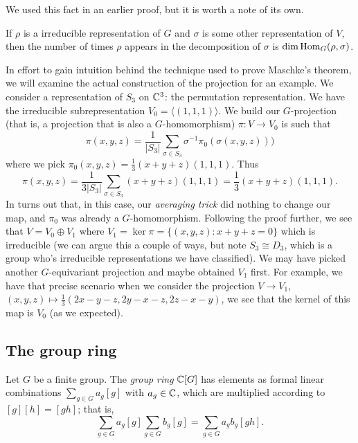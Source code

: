 We used this fact in an earlier proof, but it is worth a note of its own.

\begin{lemma}
  If $\rho$ is a irreducible representation of $G$ and $\sigma$ is some other representation of $V$, then the number of times $\rho$ appears in the decomposition of $\sigma$ is $\dim\operatorname{Hom}_G(\rho, \sigma)$.
\end{lemma}

\begin{example}
  In effort to gain intuition behind the technique used to prove Maschke's theorem, we will examine the actual construction of the projection for an example. We consider a representation of $S_3$ on $\mathbb{C}^3$: the permutation representation. We have the irreducible subrepresentation $V_0 = \langle (1,1,1) \rangle$. We build our $G$-projection (that is, a projection that is also a $G$-homomorphism) $\pi: V \to V_0$ is such that
  \[
    \pi(x,y,z) = \frac1{\lvert S_3 \rvert}\sum_{\sigma\in S_3} \sigma^{-1} \pi_0(\sigma (x,y,z)))
  \]
  where we pick $\pi_0(x,y,z) = \frac13(x+y+z)(1,1,1)$. Thus
  \[
    \pi(x,y,z) = \frac1{3\lvert S_3 \rvert}\sum_{\sigma\in S_3} (x+y+z)(1,1,1) = \frac13(x+y+z)(1,1,1).
  \]
  In turns out that, in this case, our \emph{averaging trick} did nothing to change our map, and $\pi_0$ was already a $G$-homomorphism. Following the proof further, we see that $V = V_0 \oplus V_1$ where $V_1 = \ker\pi = \{(x,y,z): x + y + z = 0\}$ which is irreducible (we can argue this a couple of ways, but note $S_3 \cong D_3$, which is a group who's irreducible representations we have classified). We may have picked another $G$-equivariant projection and maybe obtained $V_1$ first. For example, we have that precise scenario when we consider the projection $V \to V_1$, $(x,y,z) \mapsto \frac13(2x-y-z, 2y-x-z, 2z-x-y)$, we see that the kernel of this map is $V_0$ (as we expected).
\end{example}

\subsection{The group ring}

\begin{definition}
  Let $G$ be a finite group. The \emph{group ring} $\mathbb{C}[G]$ has elements as formal linear combinations $\sum_{g \in G} a_g[g]$ with $a_g \in \mathbb{C}$, which are multiplied according to $[g][h] = [gh]$; that is,
  \[\sum_{g \in G} a_g[g] \sum_{g \in G} b_g[g] = \sum_{g\in G} a_g b_g [gh].\]
\end{definition}

